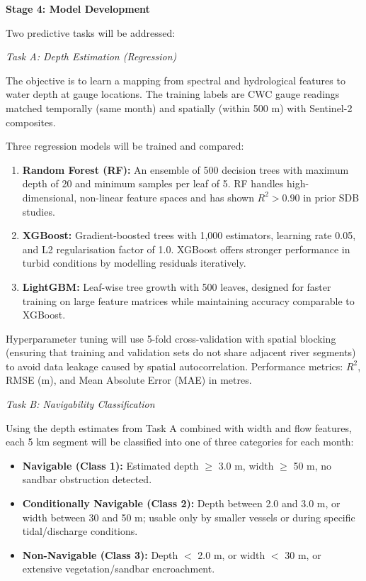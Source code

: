 \documentclass[12pt,a4paper]{article}
\begin{document}
\vspace{0.4cm}
\noindent\textbf{Stage 4: Model Development}

Two predictive tasks will be addressed:

\vspace{0.2cm}
\noindent\textit{Task A: Depth Estimation (Regression)}

The objective is to learn a mapping from spectral and hydrological features to water depth at gauge locations. The training labels are CWC gauge readings matched temporally (same month) and spatially (within 500 m) with Sentinel-2 composites.

Three regression models will be trained and compared:

\begin{enumerate}[leftmargin=1.5cm]
\item \textbf{Random Forest (RF):} An ensemble of 500 decision trees with maximum depth of 20 and minimum samples per leaf of 5. RF handles high-dimensional, non-linear feature spaces and has shown $R^{2} > 0.90$ in prior SDB studies.
\item \textbf{XGBoost:} Gradient-boosted trees with 1,000 estimators, learning rate 0.05, and L2 regularisation factor of 1.0. XGBoost offers stronger performance in turbid conditions by modelling residuals iteratively.
\item \textbf{LightGBM:} Leaf-wise tree growth with 500 leaves, designed for faster training on large feature matrices while maintaining accuracy comparable to XGBoost.
\end{enumerate}

Hyperparameter tuning will use 5-fold cross-validation with spatial blocking (ensuring that training and validation sets do not share adjacent river segments) to avoid data leakage caused by spatial autocorrelation. Performance metrics: $R^{2}$, RMSE (m), and Mean Absolute Error (MAE) in metres.

\vspace{0.2cm}
\noindent\textit{Task B: Navigability Classification}

Using the depth estimates from Task A combined with width and flow features, each 5 km segment will be classified into one of three categories for each month:

\begin{itemize}[leftmargin=1.5cm]
\item \textbf{Navigable (Class 1):} Estimated depth $\geq$ 3.0 m, width $\geq$ 50 m, no sandbar obstruction detected.
\item \textbf{Conditionally Navigable (Class 2):} Depth between 2.0 and 3.0 m, or width between 30 and 50 m; usable only by smaller vessels or during specific tidal/discharge conditions.
\item \textbf{Non-Navigable (Class 3):} Depth $<$ 2.0 m, or width $<$ 30 m, or extensive vegetation/sandbar encroachment.
\end{itemize}
\end{document}
